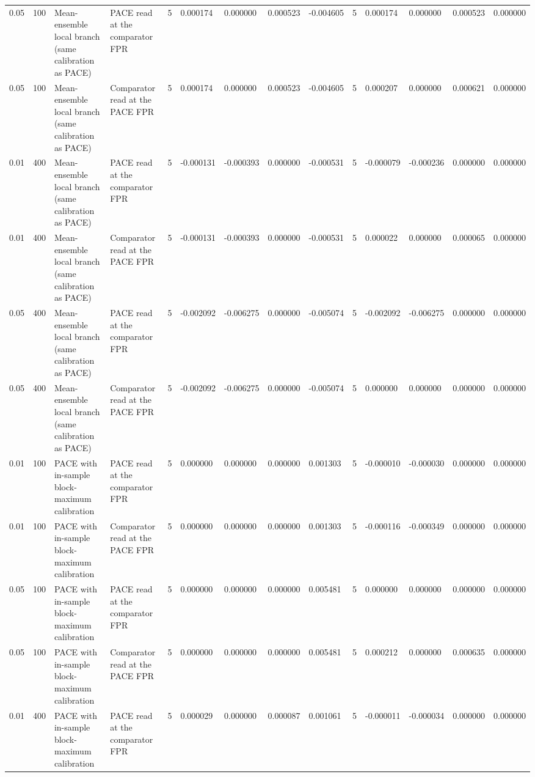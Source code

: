 \begin{tabular}{llllllllllllll}
0.05 & 100 & Mean-ensemble local branch (same calibration as PACE) & PACE read at the comparator FPR & 5 & 0.000174 & 0.000000 & 0.000523 & -0.004605 & 5 & 0.000174 & 0.000000 & 0.000523 & 0.000000 \\
0.05 & 100 & Mean-ensemble local branch (same calibration as PACE) & Comparator read at the PACE FPR & 5 & 0.000174 & 0.000000 & 0.000523 & -0.004605 & 5 & 0.000207 & 0.000000 & 0.000621 & 0.000000 \\
0.01 & 400 & Mean-ensemble local branch (same calibration as PACE) & PACE read at the comparator FPR & 5 & -0.000131 & -0.000393 & 0.000000 & -0.000531 & 5 & -0.000079 & -0.000236 & 0.000000 & 0.000000 \\
0.01 & 400 & Mean-ensemble local branch (same calibration as PACE) & Comparator read at the PACE FPR & 5 & -0.000131 & -0.000393 & 0.000000 & -0.000531 & 5 & 0.000022 & 0.000000 & 0.000065 & 0.000000 \\
0.05 & 400 & Mean-ensemble local branch (same calibration as PACE) & PACE read at the comparator FPR & 5 & -0.002092 & -0.006275 & 0.000000 & -0.005074 & 5 & -0.002092 & -0.006275 & 0.000000 & 0.000000 \\
0.05 & 400 & Mean-ensemble local branch (same calibration as PACE) & Comparator read at the PACE FPR & 5 & -0.002092 & -0.006275 & 0.000000 & -0.005074 & 5 & 0.000000 & 0.000000 & 0.000000 & 0.000000 \\
0.01 & 100 & PACE with in-sample block-maximum calibration & PACE read at the comparator FPR & 5 & 0.000000 & 0.000000 & 0.000000 & 0.001303 & 5 & -0.000010 & -0.000030 & 0.000000 & 0.000000 \\
0.01 & 100 & PACE with in-sample block-maximum calibration & Comparator read at the PACE FPR & 5 & 0.000000 & 0.000000 & 0.000000 & 0.001303 & 5 & -0.000116 & -0.000349 & 0.000000 & 0.000000 \\
0.05 & 100 & PACE with in-sample block-maximum calibration & PACE read at the comparator FPR & 5 & 0.000000 & 0.000000 & 0.000000 & 0.005481 & 5 & 0.000000 & 0.000000 & 0.000000 & 0.000000 \\
0.05 & 100 & PACE with in-sample block-maximum calibration & Comparator read at the PACE FPR & 5 & 0.000000 & 0.000000 & 0.000000 & 0.005481 & 5 & 0.000212 & 0.000000 & 0.000635 & 0.000000 \\
0.01 & 400 & PACE with in-sample block-maximum calibration & PACE read at the comparator FPR & 5 & 0.000029 & 0.000000 & 0.000087 & 0.001061 & 5 & -0.000011 & -0.000034 & 0.000000 & 0.000000 \\

\end{tabular}
